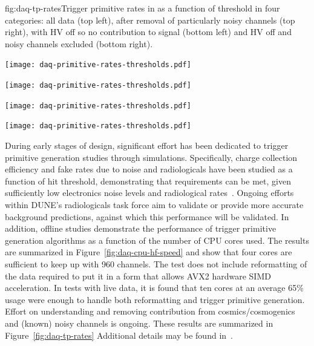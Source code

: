 \begin{dunefigure}{fig:daq-tp-rates}{Trigger primitive rates in  as a function of threshold in four categories: all data (top left),  after removal of particularly noisy channels (top right), with HV off so no contribution to signal (bottom left) and HV off and noisy channels excluded (bottom right).}
  \begin{minipage}[b]{0.5\linewidth}
    \begin{center}
      \texttt{[image: daq-primitive-rates-thresholds.pdf]}

      \texttt{[image: daq-primitive-rates-thresholds.pdf]}
    \end{center}
  \end{minipage}%
  \begin{minipage}[b]{0.5\linewidth}
    \begin{center}
      \texttt{[image: daq-primitive-rates-thresholds.pdf]}

      \texttt{[image: daq-primitive-rates-thresholds.pdf]}
    \end{center}
  \end{minipage}

\end{dunefigure}


During early stages of design, significant effort has been dedicated to
trigger primitive generation studies through simulations.
Specifically, charge collection efficiency and fake rates due to noise
and radiologicals have been studied as a function of hit threshold,
demonstrating that requirements can be met, given sufficiently low
electronics noise levels and radiological rates~\cite{bib:docdb11236}. 
Ongoing efforts within DUNE's radiologicals task force aim to validate
or provide more accurate background predictions, against which this
performance will be validated.
In addition, offline studies demonstrate the performance of trigger
primitive generation algorithms as a function of the number of CPU cores
used.  
The results are summarized in Figure~\ref{fig:daq-cpu-hf-speed} and show
that four cores are sufficient to keep up with 960 channels.
The test does not include reformatting of the data required to put it in
a form that allows AVX2 hardware SIMD acceleration.
In tests with live  data, it is found that ten cores at
an average 65\% usage were enough to handle both reformatting and
trigger primitive generation. 
Effort on understanding and removing contribution
from cosmics/cosmogenics and (known) noisy channels is ongoing.
These results are summarized in Figure~\ref{fig:daq-tp-rates}
Additional details may be found in~.

